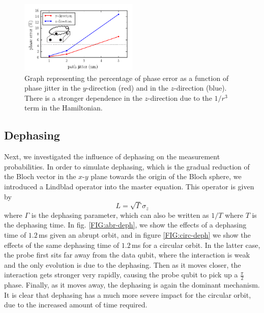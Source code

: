 \begin{figure}[h]
  \centering
    \includegraphics[width=0.5\textwidth]{../Figures/path_jit.pdf}
      \caption{Graph representing the percentage of phase error as a function of phase jitter in the $y$-direction (red) and in the $z$-direction (blue). There is a stronger dependence in the $z$-direction due to the $1/r^3$ term in the Hamiltonian.}
      \label{fig:pathjitter}
\end{figure}







\subsection{Dephasing}\label{sec:dephasing}
Next, we investigated the influence of dephasing on the measurement probabilities. In order to simulate dephasing, which is the gradual reduction of the Bloch vector in the $x$-$y$ plane towards the origin of the Bloch sphere, we introduced a Lindblad operator into the master equation. This operator is given by 
\begin{equation*}
L  = \sqrt{\Gamma} \sigma_z
\end{equation*}
where $\Gamma$ is the dephasing parameter, which can also be written as $1/T$ where $T$ is the dephasing time. In fig. \ref{FIG:abr-deph}, we show the effects of a dephasing time of $1.2\, $ms given an abrupt orbit, and in figure \ref{FIG:circ-deph} we show the effects of the same dephasing time of $1.2\, $ms for a circular orbit. In the latter case, the probe first sits far away from the data qubit, where the interaction is weak and the only evolution is due to the dephasing. Then as it moves closer, the interaction gets stronger very rapidly, causing the probe qubit to pick up a $\frac{\pi}{2}$ phase. Finally, as it moves away, the dephasing is again the dominant mechanism. 
It is clear that dephasing has a much more severe impact for the circular orbit, due to the increased amount of time required. 

